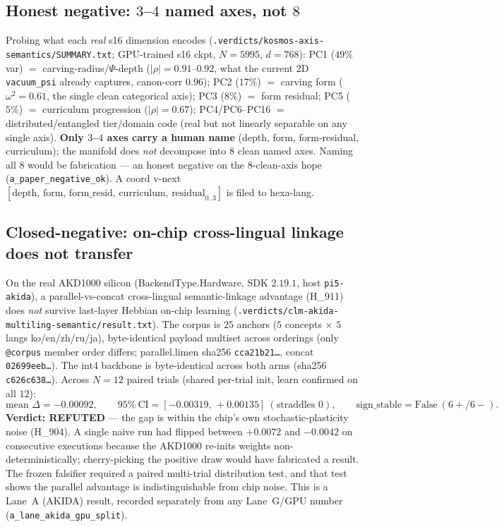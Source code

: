 \subsection{Honest negative: $3$--$4$ named axes, not $8$}
\label{app:kosmos-axis}

Probing what each \emph{real} s16 dimension encodes
(\texttt{.verdicts/kosmos-axis-semantics/SUMMARY.txt}; GPU-trained s16 ckpt,
$N=5995$, $d=768$): PC1 ($49\%$ var) $=$ carving-radius/$\Psi$-depth
($|\rho|=0.91$--$0.92$, what the current 2D \texttt{vacuum\_psi} already captures,
canon-corr $0.96$); PC2 ($17\%$) $=$ carving form ($\omega^2=0.61$, the single
clean categorical axis); PC3 ($8\%$) $=$ form residual; PC5 ($5\%$) $=$ curriculum
progression ($|\rho|=0.67$); PC4/PC6--PC16 $=$ distributed/entangled tier/domain
code (real but not linearly separable on any single axis). \textbf{Only $3$--$4$
axes carry a human name} (depth, form, form-residual, curriculum); the manifold
does \emph{not} decompose into $8$ clean named axes. Naming all $8$ would be
fabrication --- an honest negative on the $8$-clean-axis hope
(\texttt{a\_paper\_negative\_ok}). A coord v-next $[\text{depth, form,
form\_resid, curriculum, residual}_{0..3}]$ is filed to hexa-lang.

\subsection{Closed-negative: on-chip cross-lingual linkage does not transfer}
\label{app:kosmos-akida}

On the real AKD1000 silicon (BackendType.Hardware, SDK $2.19.1$, host
\texttt{pi5-akida}), a parallel-vs-concat cross-lingual semantic-linkage advantage
(H\_911) does \emph{not} survive last-layer Hebbian on-chip learning
(\texttt{.verdicts/clm-akida-multiling-semantic/result.txt}). The corpus is $25$
anchors ($5$ concepts $\times$ $5$ langs ko/en/zh/ru/ja), byte-identical payload
multiset across orderings (only \texttt{@corpus} member order differs;
parallel.limen sha256 \texttt{cca21b21\dots}, concat \texttt{02699eeb\dots}). The
int4 backbone is byte-identical across both arms (sha256 \texttt{c626c638\dots}).
Across $N=12$ paired trials (shared per-trial init, learn confirmed on all $12$):
\begin{equation}
\text{mean }\Delta = \mathbf{-0.00092},
\qquad
95\%\ \text{CI} = [-0.00319,\,+0.00135]\ (\text{straddles }0),
\qquad
\text{sign\_stable} = \text{False}\ (6{+}/6{-}).
\label{eq:akida}
\end{equation}
\textbf{Verdict: REFUTED} --- the gap is within the chip's own
stochastic-plasticity noise (H\_904). A single naive run had flipped between
$+0.0072$ and $-0.0042$ on consecutive executions because the AKD1000 re-inits
weights non-deterministically; cherry-picking the positive draw would have
fabricated a result. The frozen falsifier required a paired multi-trial
distribution test, and that test shows the parallel advantage is indistinguishable
from chip noise. This is a Lane~A (AKIDA) result, recorded separately from any
Lane~G/GPU number (\texttt{a\_lane\_akida\_gpu\_split}).

